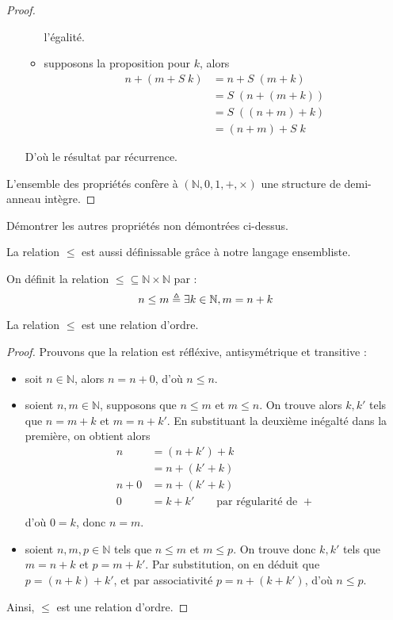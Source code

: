 \begin{proof}
\begin{itemize}
\begin{itemize}
      l'égalité.
    \item supposons la proposition pour $k$, alors
      \begin{align*}
        n+(m+S\;k) &= n + S\;(m + k)\\
        &= S\;(n+(m+k))\\
        &= S\;((n+m)+k)\\
        &= (n+m)+S\;k
      \end{align*}
    \end{itemize}
    D'où le résultat par récurrence.
  \end{itemize}
  L'ensemble des propriétés confère à $(\mathbb N,0,1,+,\times)$ une structure
  de demi-anneau intègre.
\end{proof}

\begin{exercise}
  Démontrer les autres propriétés non démontrées ci-dessus.
\end{exercise}

La relation $\leq$ est aussi définissable grâce à notre langage ensembliste.

\begin{definition}[Inégalité]
  On définit la relation $\leq\subseteq \mathbb N \times \mathbb N$ par :
  \[n \leq m \triangleq \exists k \in \mathbb N, m = n + k\]
\end{definition}

\begin{property}
  La relation $\leq$ est une relation d'ordre.
\end{property}

\begin{proof}
  Prouvons que la relation est réfléxive, antisymétrique et transitive :
  \begin{itemize}
  \item soit $n\in \mathbb N$, alors $n = n + 0$, d'où $n\leq n$.
  \item soient $n,m\in \mathbb N$, supposons que $n \leq m$ et $m \leq n$. On
    trouve alors $k,k'$ tels que $n = m + k$ et $m = n + k'$. En substituant
    la deuxième inégalté dans la première, on obtient alors
    \begin{align*}
      n &= (n + k') + k\\
      &= n + (k' + k)\\
      n + 0 &= n + (k' + k)\\
      0 &= k + k'\qquad\text{par régularité de }+\\
    \end{align*}
    d'où $0 = k$, donc $n = m$.
  \item soient $n,m,p\in \mathbb N$ tels que $n\leq m$ et $m\leq p$. On trouve
    donc $k,k'$ tels que $m = n + k$ et $p = m + k'$. Par substitution, on en
    déduit que $p = (n + k) + k'$, et par associativité $p = n + (k + k')$, d'où
    $n \leq p$.
  \end{itemize}
  Ainsi, $\leq$ est une relation d'ordre.
\end{proof}

